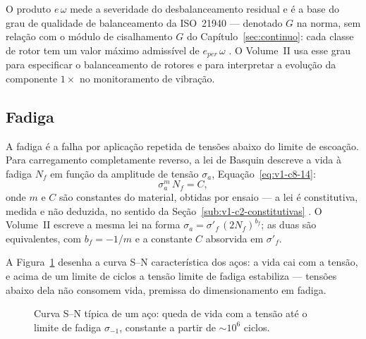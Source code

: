 \documentclass[12pt,a4paper]{article}
\numberwithin{equation}{section}
\numberwithin{table}{section}
\numberwithin{figure}{section}
\begin{document}
O produto $e\,\omega$ mede a severidade do desbalanceamento residual e é a
base do grau de qualidade de balanceamento da ISO~21940 --- denotado $G$ na
norma, sem relação com o módulo de cisalhamento $G$ do
Capítulo~\ref{sec:continuo}: cada classe de rotor tem um valor máximo
admissível de $e_{per}\,\omega$ \cite{rao2011}. O Volume~II usa esse grau
para especificar o balanceamento de rotores e para interpretar a evolução da
componente $1\times$ no monitoramento de vibração.

\subsection{Fadiga}\label{sub:v1-c8-fadiga}

A fadiga é a falha por aplicação repetida de tensões abaixo do limite de
escoação. Para carregamento completamente reverso, a lei de Basquin descreve
a vida à fadiga $N_f$ em função da amplitude de tensão $\sigma_a$,
Equação~\eqref{eq:v1-c8-14}:
\begin{equation}\label{eq:v1-c8-14}
\sigma_a^m \, N_f = C,
\end{equation}
onde $m$ e $C$ são constantes do material, obtidas por ensaio --- a lei é
constitutiva, medida e não deduzida, no sentido da
Seção~\ref{sub:v1-c2-constitutivas} \cite{shigley2011}. O Volume~II escreve
a mesma lei na forma $\sigma_a = \sigma'_f\,(2N_f)^{b_f}$; as duas são
equivalentes, com $b_f = -1/m$ e a constante $C$ absorvida em $\sigma'_f$.

A Figura~\ref{fig:v1-c8-3} desenha a curva S--N característica dos aços: a
vida cai com a tensão, e acima de um limite de ciclos a tensão limite de
fadiga estabiliza --- tensões abaixo dela não consomem vida, premissa do
dimensionamento em fadiga.

\begin{figure}[H]
\centering
{}
\caption[Curva S--N de fadiga de um aço.]{Curva S--N típica de um aço: queda
de vida com a tensão até o limite de fadiga $\sigma_{-1}$, constante a
partir de $\sim 10^6$ ciclos.}
\label{fig:v1-c8-3}
\end{figure}
\end{document}
